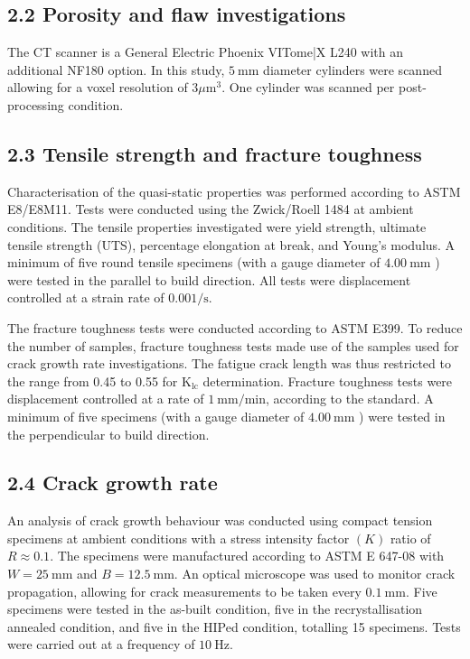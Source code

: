\documentclass[10pt]{article}
\begin{document}
\subsection*{2.2 Porosity and flaw investigations}
The CT scanner is a General Electric Phoenix VITome|X L240 with an additional NF180 option. In this study, $5 \mathrm{~mm}$ diameter cylinders were scanned allowing for a voxel resolution of $3 \mu \mathrm{m}^{3}$. One cylinder was scanned per post-processing condition.

\subsection*{2.3 Tensile strength and fracture toughness}
Characterisation of the quasi-static properties was performed according to ASTM E8/E8M11. Tests were conducted using the Zwick/Roell 1484 at ambient conditions. The tensile properties investigated were yield strength, ultimate tensile strength (UTS), percentage elongation at break, and Young's modulus. A minimum of five round tensile specimens (with a gauge diameter of $4.00 \mathrm{~mm}$ ) were tested in the parallel to build direction. All tests were displacement controlled at a strain rate of $0.001 / \mathrm{s}$.

The fracture toughness tests were conducted according to ASTM E399. To reduce the number of samples, fracture toughness tests made use of the samples used for crack growth rate investigations. The fatigue crack length was thus restricted to the range from 0.45 to 0.55 for $\mathrm{K}_{\mathrm{lc}}$ determination. Fracture toughness tests were displacement controlled at a rate of $1 \mathrm{~mm} / \mathrm{min}$, according to the standard. A minimum of five specimens (with a gauge diameter of $4.00 \mathrm{~mm}$ ) were tested in the perpendicular to build direction.

\subsection*{2.4 Crack growth rate}
An analysis of crack growth behaviour was conducted using compact tension specimens at ambient conditions with a stress intensity factor $(K)$ ratio of $R \approx 0.1$. The specimens were manufactured according to ASTM E 647-08 with $W=25 \mathrm{~mm}$ and $B=12.5 \mathrm{~mm}$. An optical microscope was used to monitor crack propagation, allowing for crack measurements to be taken every $0.1 \mathrm{~mm}$. Five specimens were tested in the as-built condition, five in the recrystallisation annealed condition, and five in the HIPed condition, totalling 15 specimens. Tests were carried out at a frequency of $10 \mathrm{~Hz}$.
\end{document}
